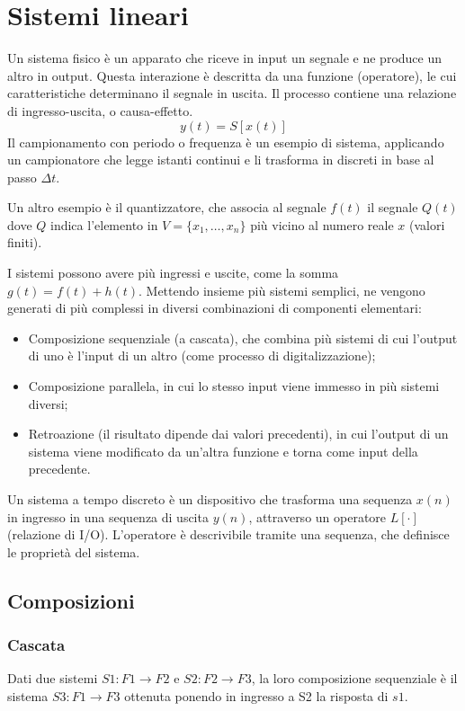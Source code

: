 \section{Sistemi lineari}
Un sistema fisico è un apparato che riceve in input un segnale e ne produce un altro in output. Questa interazione è descritta da una funzione (operatore), le cui caratteristiche determinano il segnale in uscita. Il processo contiene una relazione di ingresso-uscita, o causa-effetto.
$$y(t) = S[x(t)]$$
Il campionamento con periodo o frequenza è un esempio di sistema, applicando un campionatore che legge istanti continui e li trasforma in discreti in base al passo $\Delta t$. 

Un altro esempio è il quantizzatore, che associa al segnale $f(t)$ il segnale $Q(t)$ dove $Q$ indica l'elemento in $V = \{x_1, \dots, x_n\}$ più vicino al numero reale $x$ (valori finiti).

I sistemi possono avere più ingressi e uscite, come la somma $g(t) = f(t) + h(t)$. Mettendo insieme più sistemi semplici, ne vengono generati di più complessi in diversi combinazioni di componenti elementari:
\begin{itemize}
	\item Composizione sequenziale (a cascata), che combina più sistemi di cui l'output di uno è l'input di un altro (come processo di digitalizzazione);
	\item Composizione parallela, in cui lo stesso input viene immesso in più sistemi diversi;
	\item Retroazione (il risultato dipende dai valori precedenti), in cui l'output di un sistema viene modificato da un'altra funzione e torna come input della precedente.
\end{itemize}

Un sistema a tempo discreto è un dispositivo che trasforma una sequenza $x(n)$ in ingresso in una sequenza di uscita $y(n)$, attraverso un operatore $L[\cdot]$ (relazione di I/O). L'operatore è descrivibile tramite una sequenza, che definisce le proprietà del sistema.

\subsection{Composizioni}
\subsubsection{Cascata}
Dati due sistemi $S1 : F1 \rightarrow F2$ e $S2 : F2 \rightarrow F3$, la loro composizione sequenziale è il sistema $S3 : F1 \rightarrow F3$ ottenuta ponendo in ingresso a S2 la risposta di $s1$.

